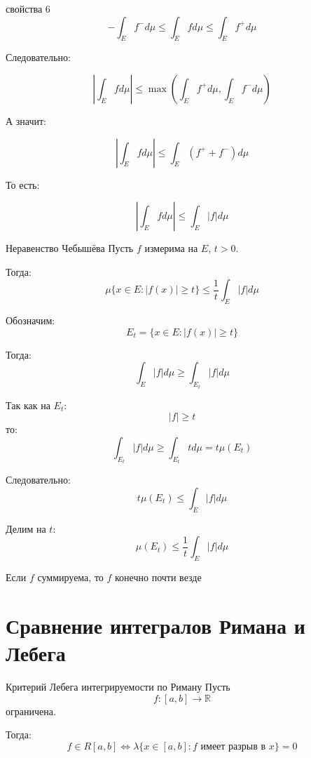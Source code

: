 \documentclass[12pt,a4paper]{article}
\begin{document}
\begin{proofbox}{свойства 6}
    \[
        -\int_E f^-d\mu
        \leq
        \int_E f d\mu
        \leq
        \int_E f^+d\mu
    \]

    Следовательно:

    \[
        \left|\int_E f d\mu\right|
        \leq
        \max
        \left(
        \int_Ef^+d\mu,
        \int_Ef^-d\mu
        \right)
    \]

    А значит:

    \[
        \left|\int_Ef d\mu\right|
        \leq
        \int_E(f^++f^-) d\mu
    \]

    То есть:

    \[
        \left|\int_Ef d\mu\right|
        \leq
        \int_E|f| d\mu
    \]
\end{proofbox}

\begin{theorem}{Неравенство Чебышёва}
    Пусть $f$ измерима на $E$, $t>0$.

    Тогда:
    \[
        \mu\{x\in E:|f(x)|\geq t\}
        \leq
        \frac1t\int_E|f| d\mu
    \]
\end{theorem}

\begin{proofbox}{}
    Обозначим:
    \[
        E_t=\{x\in E:|f(x)|\geq t\}
    \]

    Тогда:
    \[
        \int_E|f| d\mu
        \geq
        \int_{E_t}|f| d\mu
    \]

    Так как на $E_t$:
    \[
        |f|\geq t
    \]
    то:
    \[
        \int_{E_t}|f| d\mu
        \geq
        \int_{E_t}t d\mu
        =
        t\mu(E_t)
    \]

    Следовательно:
    \[
        t\mu(E_t)\leq\int_E|f| d\mu
    \]

    Делим на $t$:
    \[
        \mu(E_t)
        \leq
        \frac1t\int_E|f| d\mu
    \]
\end{proofbox}

\begin{corollary}
    Если $f$ суммируема, то $f$ конечно почти везде
\end{corollary}

\newpage

\section{Сравнение интегралов Римана и Лебега}

\begin{theorem}{Критерий Лебега интегрируемости по Риману}
    Пусть
    \[
        f:[a,b]\to\mathbb{R}
    \]
    ограничена.

    Тогда:
    \[
        f\in R[a,b]
        \Longleftrightarrow
        \lambda\{x\in[a,b]:f\text{ имеет разрыв в }x\}=0
    \]
\end{theorem}
\end{document}
